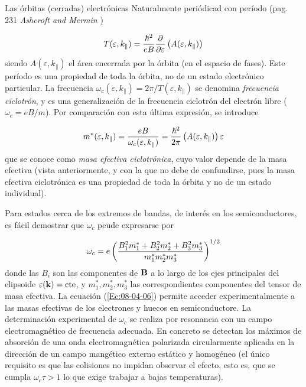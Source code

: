 Las órbitas (cerradas) electrónicas Naturalmente periódicad con período (pag. 231 \textit{Ashcroft and Mermin} \cite{Mermin_Solid_State})

\begin{equation}
	T(\varepsilon,k_\parallel) = \frac{\hbar^2}{eB} \frac{\partial }{\partial \varepsilon}\left( A(\varepsilon,k_\parallel) \right)
\end{equation}
siendo $A(\varepsilon,k_\parallel)$ el área encerrada por la órbita (en el espacio de fases). Este período es una propiedad de toda la órbita, no de un estado electrónico particular. La frecuencia $\omega_c (\varepsilon,k_\parallel)=2\pi/T(\varepsilon,k_\parallel)$ se denomina \textit{frecuencia ciclotrón}, y es una generalización de la frecuencia ciclotrón del electrón libre ($\omega_c = e B/m$). Por comparación con esta última expresión, se introduce

\begin{equation}
	m^* (\varepsilon,k_\parallel) = \frac{eB}{\omega_c (\varepsilon,k_\parallel)} = \frac{\hbar^2}{2\pi} \left( A(\varepsilon,k_\parallel) \right){\varepsilon}
\end{equation}
que se conoce como \textit{masa efectiva ciclotrónica}, cuyo valor depende de la masa efectiva (vista anteriormente, y con la que no debe de confundirse, pues la masa efectiva ciclotrónica es una propiedad de toda la órbita y no de un estado individual).

Para estados cerca de los extremos de bandas, de interés en los semiconductores, es fácil demostrar que $\omega_c$ peude expresarse por

\begin{equation}
	\omega_c = e \left( \frac{B_1^2 m_1^* + B_2^2 m_2^* + B_3^2 m_3^*}{m_1^* m_2^* m_3^*} \right)^{1/2} \label{Ec:03-04-06}
\end{equation}
donde las $B_i$ son las componentes de $\mathbf{B}$ a lo largo de los ejes principales del elipsoide $\varepsilon(\mathbf{k}) = \text{cte}$, y $m_1^*,m_2^*,m_3^*$ las correspondientes componentes del tensor de masa efectiva. La ecuación (\ref{Ec:08-04-06}) permite acceder experimentalmente a las masas efectivas de los electrones y huecos en semiconductore. La determinación experimental de $\omega_c$  se realiza por resonancia con un campo electromagnético de frecuencia adecuada. En concreto se detectan los máximos de absorción de una onda electromagnética polarizada circularmente aplicada en la dirección de un campo mangético externo estático y homogéneo (el único requisito es que las colisiones no impidan observar el efecto, esto es, que se cumpla $\omega_c \tau > 1$ lo que exige trabajar a bajas temperaturas).

